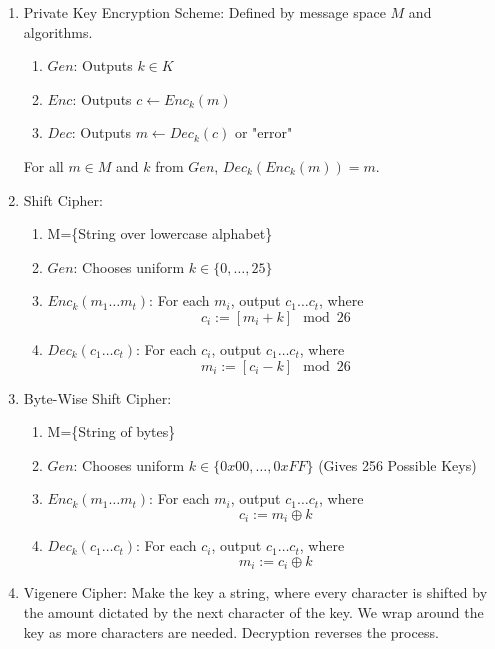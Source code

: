 \documentclass[12pt,letterpaper]{article}
\begin{document}
    \begin{enumerate}
        \item
            Private Key Encryption Scheme: Defined by message space $M$ and algorithms.
            \begin{enumerate}
                \item $Gen$: Outputs $k\in K$
                \item $Enc$: Outputs $c\leftarrow Enc_k(m)$
                \item $Dec$: Outputs $m\leftarrow Dec_k(c)$ or "error"
            \end{enumerate}
            For all $m\in M$ and $k$ from $Gen$, $Dec_k(Enc_k(m))=m$.
        \item
            Shift Cipher:
            \begin{enumerate}
                \item M=\{String over lowercase alphabet\}
                \item $Gen$: Chooses uniform $k\in\{0,\ldots,25\}$
                \item $Enc_k(m_1\ldots m_t)$: For each $m_i$, output $c_1\ldots c_t$, where
                    \[c_i:=[m_i+k]\mod 26\]
                \item $Dec_k(c_1\ldots c_t)$: For each $c_i$, output $c_1\ldots c_t$, where
                    \[m_i:=[c_i-k]\mod 26\]
            \end{enumerate}
        \item
            Byte-Wise Shift Cipher:
            \begin{enumerate}
                \item M=\{String of bytes\}
                \item $Gen$: Chooses uniform $k\in\{0x00,\ldots,0xFF\}$ (Gives 256 Possible Keys)
                \item $Enc_k(m_1\ldots m_t)$: For each $m_i$, output $c_1\ldots c_t$, where
                    \[c_i:=m_i\oplus k\]
                \item $Dec_k(c_1\ldots c_t)$: For each $c_i$, output $c_1\ldots c_t$, where
                    \[m_i:=c_i\oplus k\]
            \end{enumerate}\newpage
        \item
            Vigenere Cipher: Make the key a string, where every character is shifted by the amount dictated by the next character of the key. We wrap around the key as more characters are needed. Decryption reverses the process.
            \begin{enumerate}

\end{enumerate}
\end{enumerate}
\end{document}

